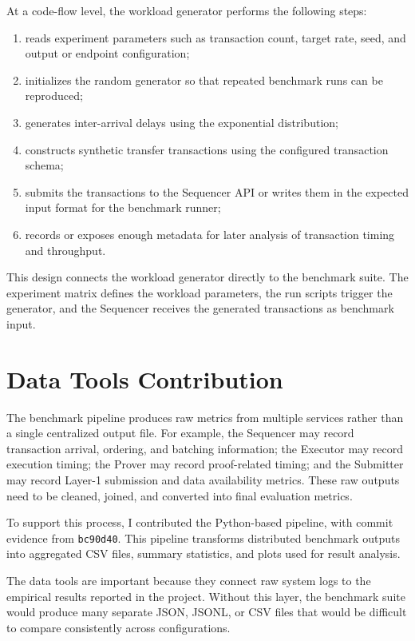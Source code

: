 At a code-flow level, the workload generator performs the following steps:

\begin{enumerate}
    \item reads experiment parameters such as transaction count, target rate, seed, and output or endpoint configuration;
    \item initializes the random generator so that repeated benchmark runs can be reproduced;
    \item generates inter-arrival delays using the exponential distribution;
    \item constructs synthetic transfer transactions using the configured transaction schema;
    \item submits the transactions to the Sequencer API or writes them in the expected input format for the benchmark runner;
    \item records or exposes enough metadata for later analysis of transaction timing and throughput.
\end{enumerate}

This design connects the workload generator directly to the benchmark suite. The experiment matrix defines the workload parameters, the run scripts trigger the generator, and the Sequencer receives the generated transactions as benchmark input.

\section{Data Tools Contribution}

The benchmark pipeline produces raw metrics from multiple services rather than a single centralized output file. For example, the Sequencer may record transaction arrival, ordering, and batching information; the Executor may record execution timing; the Prover may record proof-related timing; and the Submitter may record Layer-1 submission and data availability metrics. These raw outputs need to be cleaned, joined, and converted into final evaluation metrics.

To support this process, I contributed the Python-based  pipeline, with commit evidence from \texttt{bc90d40}. This pipeline transforms distributed benchmark outputs into aggregated CSV files, summary statistics, and plots used for result analysis.

The data tools are important because they connect raw system logs to the empirical results reported in the project. Without this layer, the benchmark suite would produce many separate JSON, JSONL, or CSV files that would be difficult to compare consistently across configurations.

